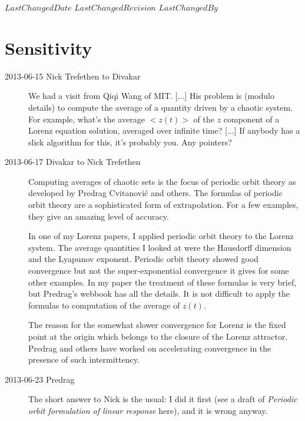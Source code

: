 \ifsvnmulti
 {$LastChangedDate$}
 {$LastChangedRevision$} {$LastChangedBy$}
\fi

\chapter{Sensitivity}
\label{c-sensitive}

\begin{description}

\item[2013-06-15 Nick Trefethen to Divakar] %
We had a visit from Qiqi Wang of MIT.  [...] His problem is (modulo
details) to compute the average of a quantity driven by a chaotic
system.  For example, what's the average $<z(t)>$ of the $z$
component of a Lorenz equation solution, averaged over infinite time?
[...] If anybody has a slick algorithm for this, it's probably you.
Any pointers?


\item[2013-06-17 Divakar to Nick Trefethen]
Computing averages of chaotic sets is the focus of periodic orbit
theory as developed by Predrag Cvitanovi\'c and others.
The formulas of periodic orbit theory are a sophisticated form of
extrapolation. For a few examples, they give an amazing level of
accuracy.

In one of my Lorenz papers, I applied periodic orbit theory
to the Lorenz system. The average quantities I looked at were the
Hausdorff dimension and the Lyapunov exponent. Periodic orbit theory
showed good convergence but not the super-exponential convergence it
gives for some other examples. In my paper the treatment of these
formulas is very brief, but Predrag's webbook \wwwcb{} has all the
details. It is not difficult to apply the formulas to computation of the
average of $z(t)$.

The reason for the somewhat slower convergence for Lorenz is the
fixed point at the origin which belongs to the closure of the Lorenz
attractor. Predrag and others have worked on accelerating convergence
in the presence of such intermittency.

\item[2013-06-23 Predrag] The short answer to Nick is the usual: I
did it first (see a draft of \emph{Periodic orbit formulation of
linear response}
{here}), and it is wrong anyway.


\end{description}
